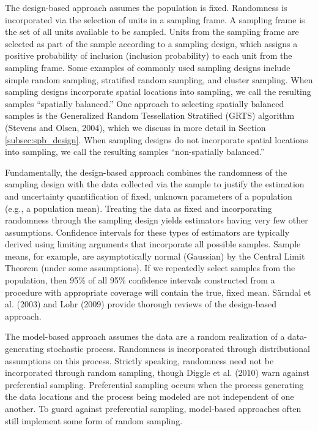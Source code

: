 \documentclass[]{elsarticle} %
\begin{document}
The design-based approach assumes the population is fixed. Randomness is
incorporated via the selection of units in a sampling frame. A sampling
frame is the set of all units available to be sampled. Units from the
sampling frame are selected as part of the sample according to a
sampling design, which assigns a positive probability of inclusion
(inclusion probability) to each unit from the sampling frame. Some
examples of commonly used sampling designs include simple random
sampling, stratified random sampling, and cluster sampling. When
sampling designs incorporate spatial locations into sampling, we call
the resulting samples ``spatially balanced.'' One approach to selecting
spatially balanced samples is the Generalized Random Tessellation
Stratified (GRTS) algorithm (Stevens and Olsen, 2004), which we discuss
in more detail in Section \ref{subsec:spb_design}. When sampling designs
do not incorporate spatial locations into sampling, we call the
resulting samples ``non-spatially balanced.''

Fundamentally, the design-based approach combines the randomness of the
sampling design with the data collected via the sample to justify the
estimation and uncertainty quantification of fixed, unknown parameters
of a population (e.g., a population mean). Treating the data as fixed
and incorporating randomness through the sampling design yields
estimators having very few other assumptions. Confidence intervals for
these types of estimators are typically derived using limiting arguments
that incorporate all possible samples. Sample means, for example, are
asymptotically normal (Gaussian) by the Central Limit Theorem (under
some assumptions). If we repeatedly select samples from the population,
then 95\% of all 95\% confidence intervals constructed from a procedure
with appropriate coverage will contain the true, fixed mean. Särndal et
al. (2003) and Lohr (2009) provide thorough reviews of the design-based
approach.

The model-based approach assumes the data are a random realization of a
data-generating stochastic process. Randomness is incorporated through
distributional assumptions on this process. Strictly speaking,
randomness need not be incorporated through random sampling, though
Diggle et al. (2010) warn against preferential sampling. Preferential
sampling occurs when the process generating the data locations and the
process being modeled are not independent of one another. To guard
against preferential sampling, model-based approaches often still
implement some form of random sampling.
\end{document}
